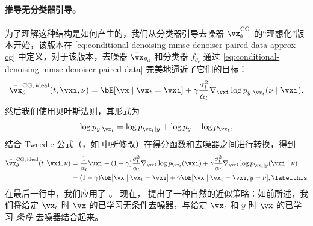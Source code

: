 \documentclass[../../book-main_zh.tex]{subfiles}
\begin{document}
\paragraph{推导无分类器引导。} 为了理解这种结构是如何产生的，我们从分类器引导去噪器 $\bar{\vx}_{\theta}^{\mathrm{CG}}$ 的“理想化”版本开始，该版本在 \eqref{eq:conditional-denoising-mmse-denoiser-paired-data-approx-cg} 中定义，对于该版本，去噪器 $\bar{\vx}_{\theta_{\mathrm{d}}}$ 和分类器 $f_{\theta_{\mathrm{c}}}$ 通过 \eqref{eq:conditional-denoising-mmse-denoiser-paired-data} 完美地逼近了它们的目标：
\begin{equation}\label{eq:conditional-denoising-mmse-denoiser-paired-data-exact-cg}
    \bar{\vx}_{\theta}^{\mathrm{CG,\,ideal}}(t, \vxi, \nu)
    =
    \bE[\vx \mid \vx_t=\vxi]
    + \gamma\frac{\sigma_t^2}{\alpha_t}
    \nabla_{\vxi}\log p_{y \mid \vx_t}(\nu\mid \vxi).
\end{equation}
然后我们使用贝叶斯法则，其形式为
\begin{equation}
    \log p_{y \mid \vx_t}
    =
    \log p_{\vx_t \mid y} + \log p_{y} - \log p_{\vx_t},
\end{equation}
结合 Tweedie 公式（，如  中所修改）在得分函数和去噪器之间进行转换，得到
\begin{align*}
    \bar{\vx}_{\theta}^{\mathrm{CG,\,ideal}}(t, \vxi, \nu)
    &=
    \frac{1}{\alpha_t} \vxi
    + (1-\gamma) \frac{\sigma_t^2}{\alpha_t}
    \nabla_{\vxi}\log p_{\vx_t}(\vxi)
    + \gamma \frac{\sigma_t^2}{\alpha_t}
    \nabla_{\vxi}\log p_{\vx_t \mid y}(\vxi \mid \nu)
    \\
    &=
    (1 - \gamma) \bE[\vx \mid \vx_t=\vxi]
    +
    \gamma \bE[\vx \mid \vx_t=\vxi, y=\nu],
    \labelthis\label{eq:ideal-cfg-denoiser}
\end{align*}
在最后一行中，我们应用了 。
现在， 提出了一种自然的近似策略：如前所述，我们将给定 $\vx_t$ 时 $\vx$ 的已学习无条件去噪器，与给定 $\vx_t$ 和 $y$ 时 $\vx$ 的已学习 \textit{条件} 去噪器结合起来。
\end{document}
